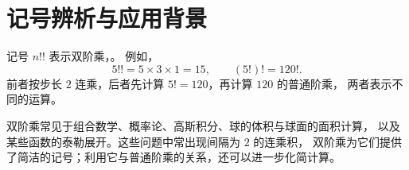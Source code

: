 \documentclass[UTF8,12pt,a4paper,fontset=fandol]{ctexart}
\begin{document}
\section{记号辨析与应用背景}

记号 $n!!$ 表示双阶乘，。
例如，
\[
  5!!=5\times3\times1=15,\qquad (5!)!=120!.
\]
前者按步长 $2$ 连乘，后者先计算 $5!=120$，再计算 $120$ 的普通阶乘，
两者表示不同的运算。

双阶乘常见于组合数学、概率论、高斯积分、球的体积与球面的面积计算，
以及某些函数的泰勒展开。这些问题中常出现间隔为 $2$ 的连乘积，
双阶乘为它们提供了简洁的记号；利用它与普通阶乘的关系，还可以进一步化简计算。
\end{document}
